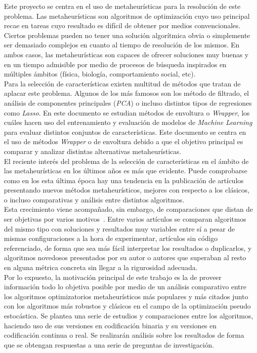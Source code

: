 Este proyecto se centra en el uso de metaheurísticas para la resolución de este problema. Las metaheurísticas son algoritmos de optimización cuyo uso principal recae en tareas cuyo resultado es difícil de obtener por medios convencionales. Ciertos problemas pueden no tener una solución algorítmica obvia o simplemente ser demasiado complejos en cuanto al tiempo de resolución de los mismos. En ambos casos, las metaheurísticas son capaces de ofrecer soluciones muy buenas y en un tiempo admisible por medio de procesos de búsqueda inspirados en múltiples ámbitos (física, biología, comportamiento social, etc). \\[6pt]
Para la selección de características existen multitud de métodos que tratan de aplacar este problema. Algunos de los más famosos son los método de filtrado, el análisis de componentes principales (\textit{PCA}) o incluso distintos tipos de regresiones como \textit{Lasso}. En este documento se estudian métodos de envoltura o \textit{Wrapper}, los cuáles hacen uso del entrenamiento y evaluación de modelos de \textit{Machine Learning} para evaluar distintos conjuntos de características. Este documento se centra en el uso de métodos \textit{Wrapper} o de envoltura debido a que el objetivo principal es comparar y analizar distintas alternativas metaheurísticas. \\[6pt]
El reciente interés del problema de la selección de características en el ámbito de las
metaheurísticas en los últimos años es más que evidente. Puede comprobarse como en los
esta última época hay una tendencia en la publicación de artículos presentando nuevos métodos
metaheurísticos, mejores con respecto a los clásicos, o incluso comparativas y análisis entre
distintos algoritmos.\\[6pt]

Esta crecimiento viene acompañado, sin embargo, de comparaciones que distan de ser objetivas
por varios motivos~\cite{molina_comprehensive_2020}. Entre varios artículos se comparan algoritmos del mismo tipo con
soluciones y resultados muy variables entre sí a pesar de mismas configuraciones a la hora
de experimentar, artículos sin código referenciado, de forma que sea más fácil interpretar
los resultados o duplicarlos, y algoritmos novedosos presentados por su autor o autores que
superaban al resto en alguna métrica concreta sin llegar a la rigurosidad adecuada.\\[6pt]

Por lo expuesto, la motivación principal de este trabajo es la de proveer información todo lo objetiva posible por medio de un análisis comparativo entre los
algoritmos optimizatorios metaheurísticos más populares y más citados junto con los
algoritmos más robustos y clásicos en el campo de la optimización pseudo estocástica. Se plantea una serie de estudios y comparaciones entre los algoritmos, haciendo uso de sus versiones en codificación binaria y su versiones en codificación continua o real. Se realizarán análisis sobre los resultados de forma que se obtengan respuestas a una serie de preguntas de investigación.

